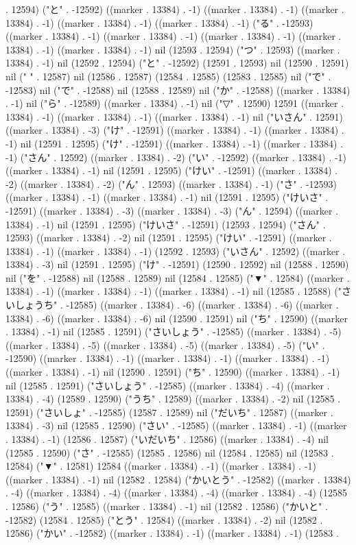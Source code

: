 . 12594) ("と" . -12592) ((marker . 13384) . -1) ((marker . 13384) . -1) ((marker . 13384) . -1) ((marker . 13384) . -1) ((marker . 13384) . -1) ("る" . -12593) ((marker . 13384) . -1) ((marker . 13384) . -1) ((marker . 13384) . -1) ((marker . 13384) . -1) ((marker . 13384) . -1) nil (12593 . 12594) ("つ" . 12593) ((marker . 13384) . -1) nil (12592 . 12594) ("と" . -12592) (12591 . 12593) nil (12590 . 12591) nil ("
" . 12587) nil (12586 . 12587) (12584 . 12585) (12583 . 12585) nil ("で" . -12583) nil ("で" . -12588) nil (12588 . 12589) nil ("か" . -12588) ((marker . 13384) . -1) nil ("ら" . -12589) ((marker . 13384) . -1) nil ("▽" . 12590) 12591 ((marker . 13384) . -1) ((marker . 13384) . -1) ((marker . 13384) . -1) nil ("いさん" . 12591) ((marker . 13384) . -3) ("け" . -12591) ((marker . 13384) . -1) ((marker . 13384) . -1) nil (12591 . 12595) ("け" . -12591) ((marker . 13384) . -1) ((marker . 13384) . -1) ("さん" . 12592) ((marker . 13384) . -2) ("い" . -12592) ((marker . 13384) . -1) ((marker . 13384) . -1) nil (12591 . 12595) ("けい" . -12591) ((marker . 13384) . -2) ((marker . 13384) . -2) ("ん" . 12593) ((marker . 13384) . -1) ("さ" . -12593) ((marker . 13384) . -1) ((marker . 13384) . -1) nil (12591 . 12595) ("けいさ" . -12591) ((marker . 13384) . -3) ((marker . 13384) . -3) ("ん" . 12594) ((marker . 13384) . -1) nil (12591 . 12595) ("けいさ" . -12591) (12593 . 12594) ("さん" . 12593) ((marker . 13384) . -2) nil (12591 . 12595) ("けい" . -12591) ((marker . 13384) . -1) ((marker . 13384) . -1) (12592 . 12593) ("いさん" . 12592) ((marker . 13384) . -3) nil (12591 . 12595) ("け" . -12591) (12590 . 12592) nil (12588 . 12590) nil ("を" . -12588) nil (12588 . 12589) nil (12584 . 12585) ("▼" . 12584) ((marker . 13384) . -1) ((marker . 13384) . -1) ((marker . 13384) . -1) nil (12585 . 12588) ("さいしょうち" . -12585) ((marker . 13384) . -6) ((marker . 13384) . -6) ((marker . 13384) . -6) ((marker . 13384) . -6) nil (12590 . 12591) nil ("ち" . 12590) ((marker . 13384) . -1) nil (12585 . 12591) ("さいしょう" . -12585) ((marker . 13384) . -5) ((marker . 13384) . -5) ((marker . 13384) . -5) ((marker . 13384) . -5) ("い" . -12590) ((marker . 13384) . -1) ((marker . 13384) . -1) ((marker . 13384) . -1) ((marker . 13384) . -1) nil (12590 . 12591) ("ち" . 12590) ((marker . 13384) . -1) nil (12585 . 12591) ("さいしょう" . -12585) ((marker . 13384) . -4) ((marker . 13384) . -4) (12589 . 12590) ("うち" . 12589) ((marker . 13384) . -2) nil (12585 . 12591) ("さいしょ" . -12585) (12587 . 12589) nil ("だいち" . 12587) ((marker . 13384) . -3) nil (12585 . 12590) ("さい" . -12585) ((marker . 13384) . -1) ((marker . 13384) . -1) (12586 . 12587) ("いだいち" . 12586) ((marker . 13384) . -4) nil (12585 . 12590) ("さ" . -12585) (12585 . 12586) nil (12584 . 12585) nil (12583 . 12584) ("▼" . 12581) 12584 ((marker . 13384) . -1) ((marker . 13384) . -1) ((marker . 13384) . -1) nil (12582 . 12584) ("かいとう" . -12582) ((marker . 13384) . -4) ((marker . 13384) . -4) ((marker . 13384) . -4) ((marker . 13384) . -4) (12585 . 12586) ("う" . 12585) ((marker . 13384) . -1) nil (12582 . 12586) ("かいと" . -12582) (12584 . 12585) ("とう" . 12584) ((marker . 13384) . -2) nil (12582 . 12586) ("かい" . -12582) ((marker . 13384) . -1) ((marker . 13384) . -1) (12583 . 